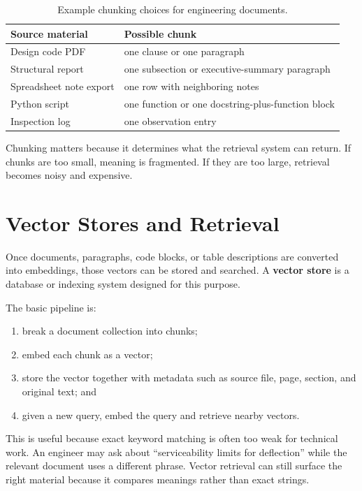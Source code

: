 \documentclass[12pt]{article}
\begin{document}
\begin{table}[ht]
    \centering
    \caption{Example chunking choices for engineering documents.}
    \begin{tabulary}{\textwidth}{L L}
        \toprule
        \textbf{Source material} & \textbf{Possible chunk} \\
        \midrule
        Design code PDF & one clause or one paragraph \\
        Structural report & one subsection or executive-summary paragraph \\
        Spreadsheet note export & one row with neighboring notes \\
        Python script & one function or one docstring-plus-function block \\
        Inspection log & one observation entry \\
        \bottomrule
    \end{tabulary}
\end{table}

Chunking matters because it determines what the retrieval system can return. If chunks are too small, meaning is fragmented. If they are too large, retrieval becomes noisy and expensive.

\section{Vector Stores and Retrieval}

Once documents, paragraphs, code blocks, or table descriptions are converted into embeddings, those vectors can be stored and searched. A \textbf{vector store} is a database or indexing system designed for this purpose.

The basic pipeline is:
\begin{enumerate}
    \item break a document collection into chunks;
    \item embed each chunk as a vector;
    \item store the vector together with metadata such as source file, page, section, and original text; and
    \item given a new query, embed the query and retrieve nearby vectors.
\end{enumerate}

This is useful because exact keyword matching is often too weak for technical work. An engineer may ask about ``serviceability limits for deflection'' while the relevant document uses a different phrase. Vector retrieval can still surface the right material because it compares meanings rather than exact strings.
\end{document}
